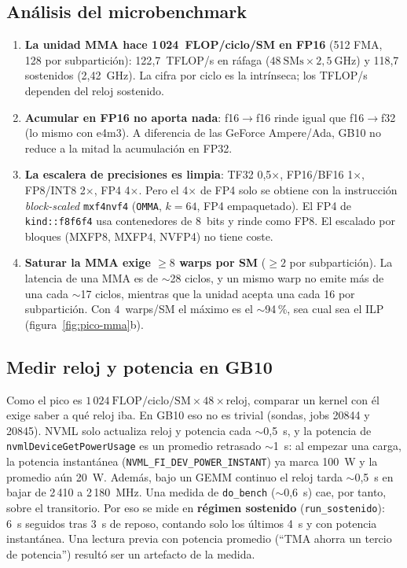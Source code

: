 \subsection{Análisis del microbenchmark}

\begin{enumerate}
  \item \textbf{La unidad MMA hace 1\,024~FLOP/ciclo/SM en FP16} (512 FMA, 128 por subpartición):
  122{,}7~TFLOP/s en ráfaga ($48~\text{SMs}\times 2{,}5~\text{GHz}$) y 118{,}7 sostenidos
  (2{,}42~GHz). La cifra por ciclo es la intrínseca; los TFLOP/s dependen del reloj sostenido.
  \item \textbf{Acumular en FP16 no aporta nada}: f16$\to$f16 rinde igual que f16$\to$f32 (lo
  mismo con e4m3). A diferencia de las GeForce Ampere/Ada, GB10 no reduce a la mitad la
  acumulación en FP32.
  \item \textbf{La escalera de precisiones es limpia}: TF32 0{,}5$\times$, FP16/BF16 1$\times$,
  FP8/INT8 2$\times$, FP4 4$\times$. Pero el 4$\times$ de FP4 solo se obtiene con la instrucción
  \emph{block-scaled} \texttt{mxf4nvf4} (\texttt{OMMA}, $k=64$, FP4 empaquetado). El FP4 de
  \texttt{kind::f8f6f4} usa contenedores de 8~bits y rinde como FP8. El escalado por bloques
  (MXFP8, MXFP4, NVFP4) no tiene coste.
  \item \textbf{Saturar la MMA exige $\geq 8$ warps por SM} ($\geq 2$ por subpartición). La
  latencia de una MMA es de $\sim$28 ciclos, y un mismo warp no emite más de una cada
  $\sim$17 ciclos, mientras que la unidad acepta una cada 16 por subpartición. Con 4~warps/SM el
  máximo es el $\sim$94\,\%, sea cual sea el ILP (figura~\ref{fig:pico-mma}b).
\end{enumerate}

\subsection{Medir reloj y potencia en GB10}

Como el pico es $1\,024~\text{FLOP/ciclo/SM}\times 48\times\text{reloj}$, comparar un kernel con él
exige saber a qué reloj iba. En GB10 eso no es trivial (sondas, jobs 20844 y 20845). NVML solo
actualiza reloj y potencia cada $\sim$0{,}5~s, y la potencia de \texttt{nvmlDeviceGetPowerUsage}
es un promedio retrasado $\sim$1~s: al empezar una carga, la potencia instantánea
(\texttt{NVML\_FI\_DEV\_POWER\_INSTANT}) ya marca 100~W y la promedio aún 20~W. Además, bajo un
GEMM continuo el reloj tarda $\sim$0{,}5~s en bajar de 2\,410 a 2\,180~MHz. Una medida de
\texttt{do\_bench} ($\sim$0{,}6~s) cae, por tanto, sobre el transitorio. Por eso se mide en
\textbf{régimen sostenido} (\texttt{run\_sostenido}): 6~s seguidos tras 3~s de reposo, contando
solo los últimos 4~s y con potencia instantánea. Una lectura previa con potencia promedio
(``TMA ahorra un tercio de potencia'') resultó ser un artefacto de la medida.

